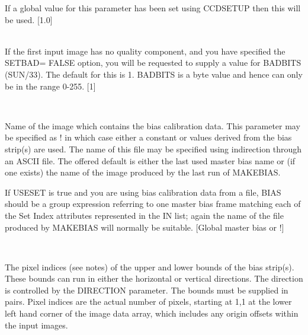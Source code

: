 \documentclass[twoside,11pt]{article}
\newcommand{\htmlref}[2]{#1}
\renewcommand{\_}{\texttt{\symbol{95}}}
\newcommand{\xroutine}[1]{\htmlref{{\sc #1}}{#1}}
\newcommand{\sstsubsection}[1]{ \item[{#1}] \mbox{} \\}
\newcommand{\sstsubsection}[1]{\item[{#1}]}
\begin{document}
{{{         If a global value for this parameter has been set using
         \xroutine{CCDSETUP} then this will be used.
         [1.0]
      }
      \sstsubsection{
         BADBITS = \_INTEGER (Read)
      } {
         If the first input image has no quality component, and you have
         specified the SETBAD= FALSE option, you will be requested to
         supply a value for BADBITS (SUN/33).  The default for this
         is 1. BADBITS is a byte value and hence can only be in the
         range 0-255.
         [1]
      }
      \sstsubsection{
         BIAS = LITERAL (Read)
      } {
         Name of the image which contains the bias calibration data. This
         parameter may be specified as ! in which case either a
         constant or values derived from the bias strip(s) are used.
         The name of this file may be specified using indirection
         through an ASCII file. The offered default is either the last
         used master bias name or (if one exists) the name of the image
         produced by the last run of \xroutine{MAKEBIAS}.

         If USESET is true and you are using bias calibration data
         from a file, BIAS should be a group expression referring
         to one master bias frame matching each of the Set Index
         attributes represented in the IN list; again the name of
         the file produced by \xroutine{MAKEBIAS} will normally be suitable.
         [Global master bias or !]
      }
      \sstsubsection{
         BOUNDS( 2 or 4 ) = \_INTEGER (Read)
      } {
         The pixel indices (see notes) of the upper and lower bounds of
         the bias strip(s). These bounds can run in either the
         horizontal or vertical directions. The direction is controlled
         by the DIRECTION parameter. The bounds must be supplied in
         pairs. Pixel indices are the actual number of pixels, starting
         at 1,1 at the lower left hand corner of the image data array,
         which includes any origin offsets within the input images.

}}}
\end{document}
